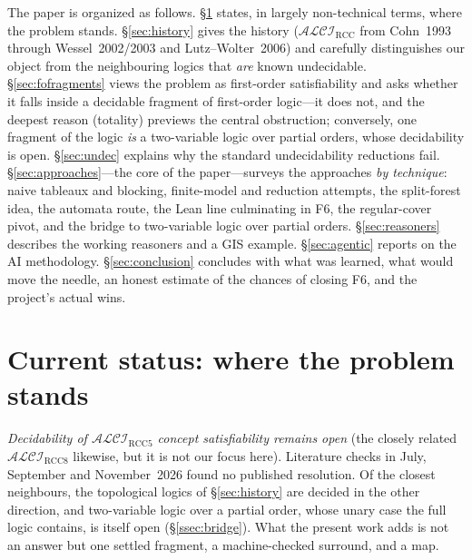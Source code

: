 \documentclass[11pt]{article}
\newcommand{\ALCIRCC}[1]{\mathcal{ALCI}_{\mathrm{RCC#1}}}
\theoremstyle{plain}
\theoremstyle{definition}
\begin{document}
The paper is organized as follows.
\S\ref{sec:status} states, in largely non-technical terms, where the
problem stands.
\S\ref{sec:history} gives the history ($\mathcal{ALCI}_{\mathrm{RCC}}$
from Cohn~1993 through Wessel~2002/2003 and Lutz--Wolter~2006) and
carefully distinguishes our object from the neighbouring logics that
\emph{are} known undecidable.
\S\ref{sec:fofragments} views the problem as first-order satisfiability
and asks whether it falls inside a decidable fragment of first-order
logic---it does not, and the deepest reason (totality) previews the
central obstruction; conversely, one fragment of the logic \emph{is} a
two-variable logic over partial orders, whose decidability is open.
\S\ref{sec:undec} explains why the standard undecidability reductions
fail.
\S\ref{sec:approaches}---the core of the paper---surveys the approaches
\emph{by technique}: naive tableaux and blocking, finite-model and
reduction attempts, the split-forest idea, the automata route, the Lean
line culminating in F6, the regular-cover pivot, and the bridge to
two-variable logic over partial orders.
\S\ref{sec:reasoners} describes the working reasoners and a GIS example.
\S\ref{sec:agentic} reports on the AI methodology.
\S\ref{sec:conclusion} concludes with what was learned, what would move
the needle, an honest estimate of the chances of closing F6, and the
project's actual wins.

\section{Current status: where the problem stands}
\label{sec:status}

\emph{Decidability of $\ALCIRCC{5}$ concept satisfiability remains open}
(the closely related $\ALCIRCC{8}$ likewise, but it is not our focus
here). Literature checks in July, September and November~2026 found no
published resolution. Of the closest neighbours, the topological logics of
\S\ref{sec:history} are decided in the other direction, and two-variable
logic over a partial order, whose unary case the full logic contains, is
itself open (\S\ref{ssec:bridge}). What the present work adds is not an
answer but one settled fragment, a machine-checked surround, and a map.
\end{document}

